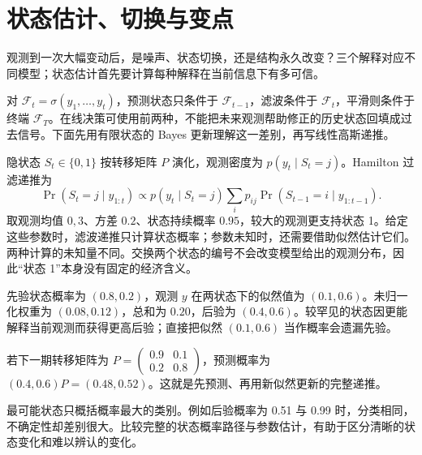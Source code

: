 \section{状态估计、切换与变点}
\label{ch:lower-stat-arb-estimation}

\begin{itemize}
  
\end{itemize}

观测到一次大幅变动后，是噪声、状态切换，还是结构永久改变？三个解释对应不同模型；状态估计首先要计算每种解释在当前信息下有多可信。



对 $\mathcal F_t=\sigma(y_1,\ldots,y_t)$，预测状态只条件于 $\mathcal F_{t-1}$，滤波条件于 $\mathcal F_t$，平滑则条件于终端 $\mathcal F_T$。在线决策可使用前两种，不能把未来观测帮助修正的历史状态回填成过去信号。下面先用有限状态的 Bayes 更新理解这一差别，再写线性高斯递推\cite{kalman1960new}。


隐状态 $S_t\in\{0,1\}$ 按转移矩阵 $P$ 演化，观测密度为 $p(y_t\mid S_t=j)$。Hamilton 过滤递推为
\[
\Pr(S_t=j\mid y_{1:t})\propto
p(y_t\mid S_t=j)\sum_i p_{ij}\Pr(S_{t-1}=i\mid y_{1:t-1}).
\]
取观测均值 $0,3$、方差 $0.2$、状态持续概率 $0.95$，较大的观测更支持状态 1。给定这些参数时，滤波递推只计算状态概率；参数未知时，还需要借助似然估计它们。两种计算的未知量不同。交换两个状态的编号不会改变模型给出的观测分布，因此“状态 1”本身没有固定的经济含义\cite{hamilton1989new}。


先验状态概率为 $(0.8,0.2)$，观测 $y$ 在两状态下的似然值为 $(0.1,0.6)$。未归一化权重为 $(0.08,0.12)$，总和为 $0.20$，后验为 $(0.4,0.6)$。较罕见的状态因更能解释当前观测而获得更高后验；直接把似然 $(0.1,0.6)$ 当作概率会遗漏先验。

若下一期转移矩阵为 $P=\left(\begin{smallmatrix}0.9&0.1\\0.2&0.8\end{smallmatrix}\right)$，预测概率为 $(0.4,0.6)P=(0.48,0.52)$。这就是先预测、再用新似然更新的完整递推。

\begin{diagnostic}
最可能状态只概括概率最大的类别。例如后验概率为 0.51 与 0.99 时，分类相同，不确定性却差别很大。比较完整的状态概率路径与参数估计，有助于区分清晰的状态变化和难以辨认的变化。
\end{diagnostic}

